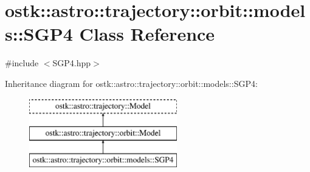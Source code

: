 \hypertarget{classostk_1_1astro_1_1trajectory_1_1orbit_1_1models_1_1_s_g_p4}{}\section{ostk\+:\+:astro\+:\+:trajectory\+:\+:orbit\+:\+:models\+:\+:S\+G\+P4 Class Reference}
\label{classostk_1_1astro_1_1trajectory_1_1orbit_1_1models_1_1_s_g_p4}


{\ttfamily \#include $<$S\+G\+P4.\+hpp$>$}

Inheritance diagram for ostk\+:\+:astro\+:\+:trajectory\+:\+:orbit\+:\+:models\+:\+:S\+G\+P4\+:\begin{figure}[H]
\begin{center}
\leavevmode
\includegraphics[height=3.000000cm]{classostk_1_1astro_1_1trajectory_1_1orbit_1_1models_1_1_s_g_p4}
\end{center}
\end{figure}
